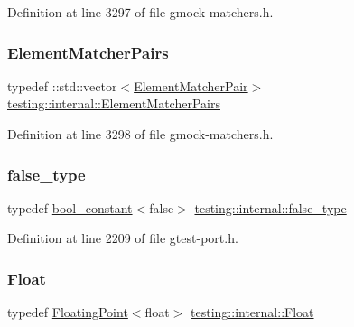 Definition at line 3297 of file gmock-\/matchers.\+h.

\mbox{\label{namespacetesting_1_1internal_a0038618710c01a71150887dc7cfb0a29}} 
\subsubsection{\texorpdfstring{Element\+Matcher\+Pairs}{ElementMatcherPairs}}
{\footnotesize\ttfamily typedef \+::std\+::vector$<$\hyperlink{namespacetesting_1_1internal_a109863545f08651178bf0f520aebd33b}{Element\+Matcher\+Pair}$>$ \hyperlink{namespacetesting_1_1internal_a0038618710c01a71150887dc7cfb0a29}{testing\+::internal\+::\+Element\+Matcher\+Pairs}}



Definition at line 3298 of file gmock-\/matchers.\+h.

\mbox{\label{namespacetesting_1_1internal_abb1d0789f19bdde21affccbd1078b525}} 
\subsubsection{\texorpdfstring{false\+\_\+type}{false\_type}}
{\footnotesize\ttfamily typedef \hyperlink{structtesting_1_1internal_1_1bool__constant}{bool\+\_\+constant}$<$false$>$ \hyperlink{namespacetesting_1_1internal_abb1d0789f19bdde21affccbd1078b525}{testing\+::internal\+::false\+\_\+type}}



Definition at line 2209 of file gtest-\/port.\+h.

\mbox{\label{namespacetesting_1_1internal_a02e1981f5ff70609e6ac06e006ff519a}} 
\subsubsection{\texorpdfstring{Float}{Float}}
{\footnotesize\ttfamily typedef \hyperlink{classtesting_1_1internal_1_1FloatingPoint}{Floating\+Point}$<$float$>$ \hyperlink{namespacetesting_1_1internal_a02e1981f5ff70609e6ac06e006ff519a}{testing\+::internal\+::\+Float}}



